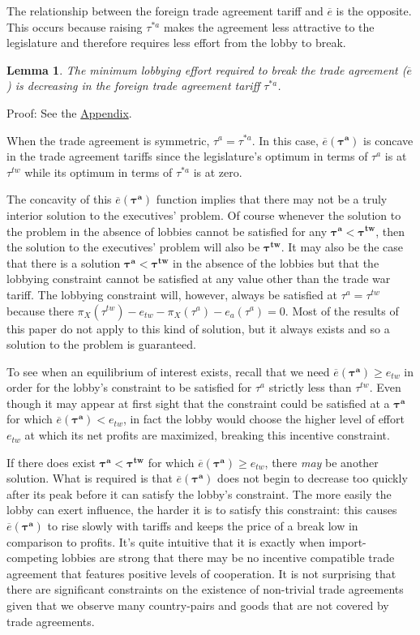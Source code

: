 \documentclass[authoryear, review]{elsarticle}
\newtheorem{lemma}{Lemma}
\newcommand{\ov}{\overline}
\newcommand{\bta}{\bm{\tau^a}}
\newcommand{\btw}{\bm{\tau^{tw}}}
\begin{document}
The relationship between the foreign trade agreement tariff and $\ov{e}$ is the opposite. This occurs because raising $\tau^{*a}$ makes the agreement less attractive to the legislature and therefore requires less effort from the lobby to break.
\begin{lemma}
  The minimum lobbying effort required to break the trade agreement ($\ov{e}$) is decreasing in the foreign trade agreement tariff $\tau^{*a}$.
  \label{lem:ets}
\end{lemma}
Proof: See the \hyperlink{Lem_ets}{Appendix}.

When the trade agreement is symmetric, $\tau^a = \tau^{*a}$. In this case, $\ov{e}(\bta)$ is concave in the trade agreement tariffs since the legislature's optimum in terms of $\tau^a$ is at $\tau^{tw}$ while its optimum in terms of $\tau^{*a}$ is at zero.

The concavity of this $\ov{e}(\bta)$ function implies that there may not be a truly interior solution to the executives' problem. Of course whenever the solution to the problem in the absence of lobbies cannot be satisfied for any $\bta < \btw$, then the solution to the executives' problem will also be $\btw$. It may also be the case that there is a solution $\bta < \btw$ in the absence of the lobbies but that the lobbying constraint cannot be satisfied at any value other than the trade war tariff. The lobbying constraint will, however, always be satisfied at $\tau^a = \tau^{tw}$ because there $\pi_X(\tau^{tw}) -e_{tw} - \pi_X(\tau^a) - e_a(\tau^a) =0$. Most of the results of this paper do not apply to this kind of solution, but it always exists and so a solution to the problem is guaranteed.

To see when an equilibrium of interest exists, recall that we need $\ov{e}(\bta) \geq e_{tw}$ in order for the lobby's constraint to be  satisfied for $\tau^a$ strictly less than $\tau^{tw}$. Even though it may appear at first sight that the constraint could be satisfied at a $\bta$ for which $\ov{e}(\bta) < e_{tw}$, in fact the lobby would choose the higher level of effort $e_{tw}$ at which its net profits are maximized, breaking this incentive constraint. 

If there does exist $\bta < \btw$ for which $\ov{e}(\bta) \geq e_{tw}$, there \textit{may} be another solution. What is required is that $\ov{e}(\bta)$ does not begin to decrease too quickly after its peak before it can satisfy the lobby's constraint. The more easily the lobby can exert influence, the harder it is to satisfy this constraint: this causes $\ov{e}(\bta)$ to rise slowly with tariffs and keeps the price of a break low in comparison to profits. It's quite intuitive that it is exactly when import-competing lobbies are strong that there may be no incentive compatible trade agreement that features positive levels of cooperation. It is not surprising that there are significant constraints on the existence of non-trivial trade agreements given that we observe many country-pairs and goods that are not covered by trade agreements.
\end{document}
